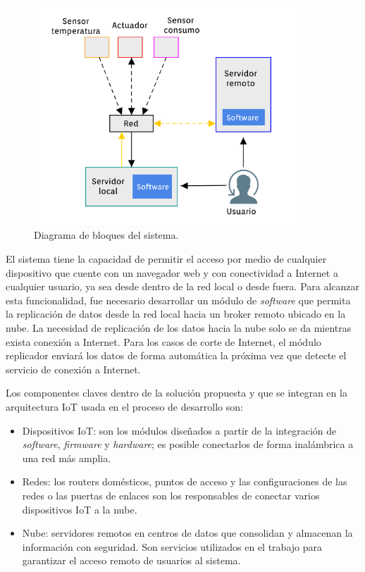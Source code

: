 \begin{figure}[htbp]
	\centering
	\includegraphics[width=0.9\textwidth]{./Figures/bloques.png}
	\caption{Diagrama de bloques del sistema.}

	\label{fig:diagrama1}
\end{figure}

El sistema tiene la capacidad de permitir el acceso por medio de cualquier dispositivo que cuente con un navegador web y con conectividad a Internet a cualquier usuario, ya sea desde dentro de la red local o desde fuera. Para alcanzar esta funcionalidad, fue necesario desarrollar un módulo de \emph{software} que permita la replicación de datos desde la red local hacia un broker remoto ubicado en la nube. La necesidad de replicación de los datos hacia la nube solo se da mientras exista conexión a Internet. Para los casos de corte de Internet, el módulo replicador enviará los datos de forma automática la próxima vez que detecte el servicio de conexión a Internet. 

Los componentes claves dentro de la solución propuesta y que se integran en la arquitectura IoT usada en el proceso de desarrollo son: 


\begin{itemize}
\item Dispositivos IoT: son los módulos diseñados a partir de la integración de \emph{software}, \emph{firmware} y \emph{hardware}; es posible conectarlos de forma inalámbrica a una red más amplia.
\item Redes: los routers domésticos, puntos de acceso y las configuraciones de las redes o las puertas de enlaces son los responsables de conectar varios dispositivos IoT a la nube.
\item Nube: servidores remotos en centros de datos que consolidan y almacenan la información con seguridad. Son servicios utilizados en el trabajo para garantizar el acceso remoto de usuarios al sistema.
\end{itemize}

